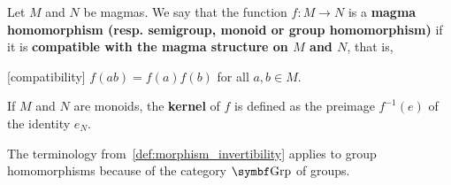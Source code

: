 \begin{definition}\label{def:group_homomorphism}
  Let \( M \) and \( N \) be magmas. We say that the function \( f: M \to N \) is a \textbf{magma homomorphism (resp. semigroup, monoid or group homomorphism)} if it is \textbf{compatible with the magma structure on \( M \) and \( N \)}, that is,
  \begin{description}
    [compatibility] \( f(ab) = f(a) f(b) \) for all \( a, b \in M \).
  \end{description}

  If \( M \) and \( N \) are monoids, the \textbf{kernel} of \( f \) is defined as the preimage \( f^{-1}(e) \) of the identity \( e_N \).

  The terminology from~\cref{def:morphism_invertibility} applies to group homomorphisms because of the category \( \Bold{Grp} \) of groups.
\end{definition}

